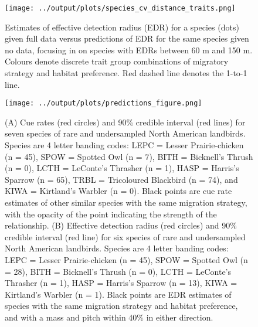 \documentclass[12pt]{article}
\begin{document}
\begin{figure}[h]
	\texttt{[image: ../output/plots/species\_cv\_distance\_traits.png]}
	\caption{Estimates of effective detection radius (EDR) for a species (dots) given full data versus predictions of EDR for the same species given no data, focusing in on species with EDRs between 60 m and 150 m. Colours denote discrete trait group combinations of migratory strategy and habitat preference. Red dashed line denotes the 1-to-1 line.}
	\label{fig:distance_cv_traits}
\end{figure}

\begin{figure}[h]
	\texttt{[image: ../output/plots/predictions\_figure.png]}
	\caption{(A) Cue rates (red circles) and 90\% credible interval (red lines) for seven species of rare and undersampled North American landbirds. Species are 4 letter banding codes: LEPC = Lesser Prairie-chicken (n = 45), SPOW = Spotted Owl (n = 7), BITH = Bicknell's Thrush (n = 0), LCTH = LeConte's Thrasher (n = 1), HASP = Harris's Sparrow (n = 65), TRBL = Tricoloured Blackbird (n = 74), and KIWA = Kirtland's Warbler (n = 0). Black points are cue rate estimates of other similar species with the same migration strategy, with the opacity of the point indicating the strength of the relationship. (B) Effective detection radius (red circles) and 90\% credible interval (red line) for six species of rare and undersampled North American landbirds. Species are 4 letter banding codes: LEPC = Lesser Prairie-chicken (n = 45), SPOW = Spotted Owl (n = 28), BITH = Bicknell's Thrush (n = 0), LCTH = LeConte's Thrasher (n = 1), HASP = Harris's Sparrow (n = 13), KIWA = Kirtland's Warbler (n = 1). Black points are EDR estimates of species with the same migration strategy and habitat preference, and with a mass and pitch within 40\% in either direction.}
	\label{fig:predictions}
\end{figure}
\end{document}
